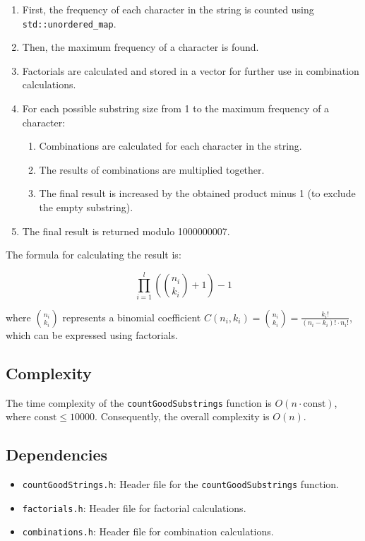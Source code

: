 \documentclass{article}
\begin{document}
\begin{enumerate}
  \item First, the frequency of each character in the string is counted using \texttt{std::unordered\_map}.
  \item Then, the maximum frequency of a character is found.
  \item Factorials are calculated and stored in a vector for further use in combination calculations.
  \item For each possible substring size from 1 to the maximum frequency of a character:
    \begin{enumerate}
      \item Combinations are calculated for each character in the string.
      \item The results of combinations are multiplied together.
      \item The final result is increased by the obtained product minus 1 (to exclude the empty substring).
    \end{enumerate}
  \item The final result is returned modulo 1000000007.
\end{enumerate}

The formula for calculating the result is:

\[
\prod_{i=1}^{l} \left( \binom{n_i}{k_i} + 1 \right) - 1
\]

where \(\binom{n_i}{k_i}\) represents a binomial coefficient \(C(n_i, k_i) = \binom{n_i}{k_i} = \frac{k_i!}{(n_i - k_i)! \cdot n_i!}\), which can be expressed using factorials.

\subsection*{Complexity}

The time complexity of the \texttt{countGoodSubstrings} function is \(O(n \cdot \text{{const}})\), where \(\text{{const}} \leq 10000\). Consequently, the overall complexity is \(O(n)\).

\subsection*{Dependencies}

\begin{itemize}
  \item \texttt{countGoodStrings.h}: Header file for the \texttt{countGoodSubstrings} function.
  \item \texttt{factorials.h}: Header file for factorial calculations.
  \item \texttt{combinations.h}: Header file for combination calculations.
\end{itemize}
\end{document}
